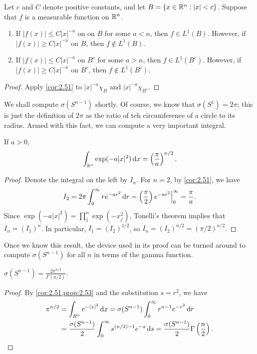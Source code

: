 \documentclass[12pt]{article} %
\begin{document}
\begin{corollary}
    Let $c$ and $C$ denote positive constants, and let $B = \{x \in \mathbb{R}^n : |x| < c\}$. Suppose that $f$ is a measurable function on $\mathbb{R}^n$. \begin{enumerate}
        \item If $|f(x)| \leq C|x|^{-a}$ on on $B$ for some $a < n$, then $f \in L^1(B)$. However, if $|f(x)| \geq C|x|^{-n}$ on $B$, then $f \notin L^1(B)$.
        \item If $|f(x)| \leq C|x|^{-a}$ on $B^c$ for some $a > n$, then $f \in L^1(B^c)$. However, if $|f(x)| \geq C|x|^{-n}$ on $B^c$, then $f \notin L^1(B^c)$.
    \end{enumerate}
\end{corollary}

\begin{proof}
    Apply \cref{cor:2.51} to $|x|^{-a}\chi_B$ and $|x|^{-a}\chi_{B^c}$.
\end{proof}

We shall compute $\sigma(S^{n-1})$ shortly. Of course, we know that $\sigma(S^1) = 2\pi$; this is just the definition of $2 \pi$ as the ratio of teh circumference of a circle to its radius. Armed with this fact, we can compute a very important integral.

\begin{proposition}\label{prop:2.53}
    If $a > 0$, \[\int_{\mathbb{R}^n} \exp(-a|x|^2)\, \mathrm{d} x = \left(\frac{\pi}{a}\right)^{n/2}.\]
\end{proposition}

\begin{proof}
    Denote the integral on the left by $I_n$. For $n = 2$, by \cref{cor:2.51}, we have \[I_2 = 2\pi \int_0^\infty re^{-ar^2}\, \mathrm{d} r = \left(\frac{\pi}{2}\right) e^{-ar^2} \Big|_0^\infty = \frac{\pi}{a}.\] Since $\exp(-a|x|^2) = \prod_1^n \exp(-x_j^2)$, Tonelli's theorem implies that $I_n = (I_1)^n$. In particular, $I_1 = (I_2)^{1/2}$, so $I_n = (I_2)^{n/2} = (\pi/2)^{n/2}$.
\end{proof}

Once we know this result, the device used in its proof can be turned around to compute $\sigma(S^{n-1})$ for all $n$ in terms of the gamma function.

\begin{proposition}
    $\sigma(S^{n-1}) = \frac{2\pi^{n/2}}{\Gamma(n/2)}$.
\end{proposition}

\begin{proof}
    By \cref{cor:2.51,prop:2.53} and the substitution $s = r^2$, we have \begin{align*}
        \pi^{n/2} &= \int_{R^n} e^{-|x|^2} \, \mathrm{d} x = \sigma(S^{n-1}) \int_0^\infty r^{n-1} e^{-r^2} \, \mathrm{d} r\\
        &= \frac{\sigma(S^{n-1})}{2} \int_0^\infty s^{(n/2) - 1}e^{-s} \, \mathrm{d} s = \frac{\sigma(S^{n-1})}{2} \Gamma\left(\frac{n}{2}\right).
    \end{align*}
\end{proof}
\end{document}
